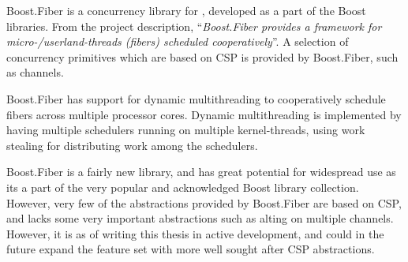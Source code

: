 Boost.Fiber is a concurrency library for \Cpp{} \citep{kowalke2017boost}, developed as a part of the \Cpp{} Boost libraries. From the project description, ``\textit{Boost.Fiber provides a framework for micro-/userland-threads (fibers) scheduled cooperatively}''. A selection of concurrency primitives which are based on CSP is provided by Boost.Fiber, such as channels.

Boost.Fiber has support for dynamic multithreading to cooperatively schedule fibers across multiple processor cores. Dynamic multithreading is implemented by having multiple schedulers running on multiple kernel\hyp{}threads, using work stealing for distributing work among the schedulers.

Boost.Fiber is a fairly new library, and has great potential for widespread use as its a part of the very popular and acknowledged Boost library collection. However, very few of the abstractions provided by Boost.Fiber are based on CSP, and lacks some very important abstractions such as alting on multiple channels. However, it is as of writing this thesis in active development, and could in the future expand the feature set with more well sought after CSP abstractions. 
